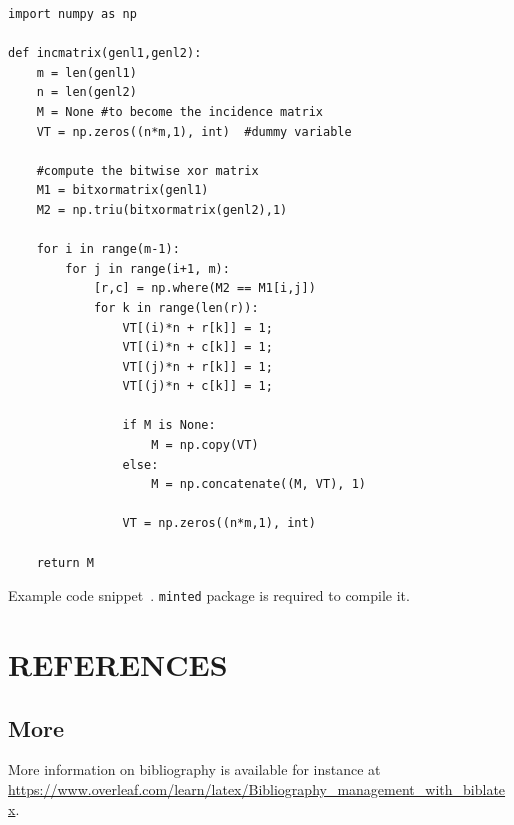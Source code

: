 \documentclass{reportOpenlab} %
\begin{document}
\begin{longlisting}
\begin{verbatim}
import numpy as np
    
def incmatrix(genl1,genl2):
    m = len(genl1)
    n = len(genl2)
    M = None #to become the incidence matrix
    VT = np.zeros((n*m,1), int)  #dummy variable
    
    #compute the bitwise xor matrix
    M1 = bitxormatrix(genl1)
    M2 = np.triu(bitxormatrix(genl2),1) 

    for i in range(m-1):
        for j in range(i+1, m):
            [r,c] = np.where(M2 == M1[i,j])
            for k in range(len(r)):
                VT[(i)*n + r[k]] = 1;
                VT[(i)*n + c[k]] = 1;
                VT[(j)*n + r[k]] = 1;
                VT[(j)*n + c[k]] = 1;
                
                if M is None:
                    M = np.copy(VT)
                else:
                    M = np.concatenate((M, VT), 1)
                
                VT = np.zeros((n*m,1), int)
    
    return M
\end{verbatim}
\caption{Example code snippet~\cite{code}. \texttt{minted} package is required to compile it.}
\label{code:example}
\end{longlisting}
\fi

\section{REFERENCES}
\printbibliography[heading=none]

\subsection{More}
More information on bibliography is available for instance at \url{https://www.overleaf.com/learn/latex/Bibliography_management_with_biblatex}.
\end{document}
